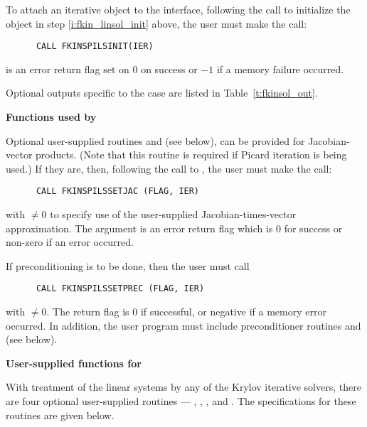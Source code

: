 \begin{Steps}
  To attach an iterative {\sunlinsol} object to the {\kinspils}
  interface, following the call to initialize the {\sunlinsol}
  object in step \ref{i:fkin_linsol_init} above, the user must make the
  call:
\begin{verbatim}
      CALL FKINSPILSINIT(IER)
\end{verbatim}
   is an error return flag set on $0$ on success or $-1$ if a memory 
  failure occurred.

  Optional outputs specific to the {\kinspils} case are listed in
  Table~\ref{t:fkinsol_out}.


  {\bf Functions used by {\kinspils}}

  Optional user-supplied routines  and 
  (see below), can be provided for Jacobian-vector products.  
  (Note that this routine is required if Picard iteration is being used.)
  If they are, then, following the call to , the user must 
  make the call:
\begin{verbatim}
      CALL FKINSPILSSETJAC (FLAG, IER)
\end{verbatim}
  with  $\neq 0$ to specify use of the user-supplied
  Jacobian-times-vector approximation.
  The argument  is an error return flag which is $0$ 
  for success or non-zero if an error occurred.

  If preconditioning is to be done, then the user must call
\begin{verbatim}
      CALL FKINSPILSSETPREC (FLAG, IER)
\end{verbatim}
  with  $\neq 0$.  The return flag  is 0 if
  successful, or negative if a memory error occurred.
  In addition, the user program must include
  preconditioner routines  and  (see below).


 {\bf User-supplied functions for {\kinspils}}

  With treatment of the linear systems by any of the Krylov iterative
  solvers, there are four optional user-supplied routines ---
  , , , and .  The specifications
  for these routines are given below.


\end{Steps}
